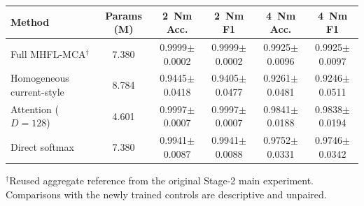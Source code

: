 \begin{tabular}{@{}lccccc@{}}
\toprule
Method & Params (M) & 2~Nm Acc. & 2~Nm F1 & 4~Nm Acc. & 4~Nm F1 \\
\midrule
Full MHFL-MCA$^{\dagger}$ & 7.380 & 0.9999$\pm$0.0002 & 0.9999$\pm$0.0002 & 0.9925$\pm$0.0096 & 0.9925$\pm$0.0097 \\
Homogeneous current-style & 8.784 & 0.9445$\pm$0.0418 & 0.9405$\pm$0.0477 & 0.9261$\pm$0.0481 & 0.9246$\pm$0.0511 \\
Attention ($D=128$) & 4.601 & 0.9997$\pm$0.0007 & 0.9997$\pm$0.0007 & 0.9841$\pm$0.0188 & 0.9838$\pm$0.0194 \\
Direct softmax & 7.380 & 0.9941$\pm$0.0087 & 0.9941$\pm$0.0088 & 0.9752$\pm$0.0331 & 0.9746$\pm$0.0342 \\
\bottomrule
\end{tabular}

\footnotesize $^{\dagger}$Reused aggregate reference from the original Stage-2 main experiment. Comparisons with the newly trained controls are descriptive and unpaired.
